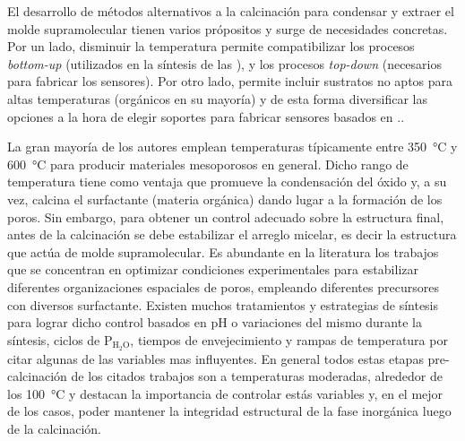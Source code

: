 	El desarrollo de métodos alternativos a la calcinación para condensar y extraer el molde supramolecular tienen varios própositos y surge de necesidades concretas. Por un lado, disminuir la temperatura permite compatibilizar los procesos \textit{bottom-up} (utilizados en la síntesis de las \pdm), y los procesos \textit{top-down} (necesarios para fabricar los sensores). Por otro lado, permite incluir sustratos no aptos para altas temperaturas (orgánicos en su mayoría) y de esta forma diversificar las opciones a la hora de elegir soportes para fabricar sensores basados en \pdm.\cite{Doshi2000a,Wagner2013,Innocenzi2013,Soler-Illia2002a,Zhang2005}.

	La gran mayoría de los autores emplean temperaturas típicamente entre \SI{350}{\celsius} y \SI{600}{\celsius} para producir materiales mesoporosos en general. Dicho rango de temperatura tiene como ventaja que promueve la condensación del óxido y, a su vez, calcina el surfactante (materia orgánica) dando lugar a la formación de los poros.\cite{Kresge1992,Beck1992,DiRenzo1997}  Sin embargo, para obtener un control adecuado sobre la estructura final, antes de la calcinación se debe estabilizar el arreglo micelar, es decir la estructura que actúa de molde supramolecular. Es abundante en la literatura los trabajos que se concentran en optimizar condiciones experimentales para estabilizar diferentes organizaciones espaciales de poros, empleando diferentes precursores con diversos surfactante\cite{Huo1996,Herregods2013,Grosso2001}. Existen muchos tratamientos y estrategias de síntesis para lograr dicho control basados en pH o variaciones del mismo durante la síntesis\cite{Doshi2000a,Soler-Illia2011,Boissiere2000,Huo1996,GonzalezSolveyra2017,Ichinose2002}, ciclos de P$_\text{H$_2$O}$\cite{Cagnol2002,Soler-Illia2012}, tiempos de envejecimiento\cite{Malfatti2009,Grosso2001} y rampas de temperatura\cite{Huang2002,Andrini2016,Soler-Illia2006,Rohlfing2005} por citar algunas de las variables mas influyentes. En general todos estas etapas pre-calcinación de los citados trabajos son a temperaturas moderadas, alrededor de los \SI{100}{\celsius} y destacan la importancia de controlar estás variables y, en el mejor de los casos, poder mantener la integridad estructural de la fase inorgánica luego de la calcinación. 

